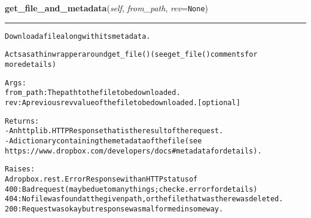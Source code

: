 \hspace{.8\funcindent}\begin{boxedminipage}{\funcwidth}

    \raggedright \textbf{get\_file\_and\_metadata}(\textit{self}, \textit{from\_path}, \textit{rev}={\tt None})

    \vspace{-1.5ex}

    \rule{\textwidth}{0.5\fboxrule}
\setlength{\parskip}{2ex}
\begin{alltt}
Download a file alongwith its metadata.

Acts as a thin wrapper around get\_file() (see get\_file() comments for
more details)

Args:
    from\_path: The path to the file to be downloaded.
    rev: A previous rev value of the file to be downloaded. [optional]

Returns:
    - An httplib.HTTPResponse that is the result of the request.
    - A dictionary containing the metadata of the file (see
      https://www.dropbox.com/developers/docs\#metadata for details).

Raises:
    A dropbox.rest.ErrorResponse with an HTTP status of
       400: Bad request (may be due to many things; check e.error for details)
       404: No file was found at the given path, or the file that was there was deleted.
       200: Request was okay but response was malformed in some way.
\end{alltt}

\setlength{\parskip}{1ex}
    \end{boxedminipage}

    \label{lib:dropbox:DropboxClient:file_copy}

    \vspace{0.5ex}

